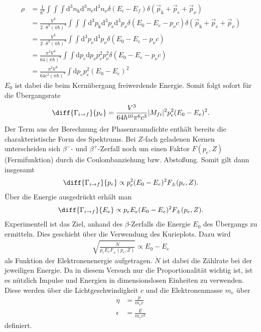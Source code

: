 \begin{align*}
  \rho&= \frac{1}{8^3}\int\int \int \mathrm{d}^3n_\mathrm{k} \mathrm{d}^3n_\mathrm{e}  \mathrm{d}^3n_\nu \delta (E_i-E_f) \delta (\vec{p}_\mathrm{k}+\vec{p}_e+\vec{p}_\nu)\\
  &=\frac{V^3}{2\cdot 8^3(\pi \hbar)^9} \int \int \int \mathrm{d}^3p_\mathrm{k}   \mathrm{d}^3p_\mathrm{e}  \mathrm{d}^3p_\nu\delta (E_0-E_e-p_\nu c) \delta (\vec{p}_\mathrm{k}+\vec{p}_e+\vec{p}_\nu)\\
  &=\frac{V^3}{2\cdot 8^3(\pi \hbar)^9}  \int \int  \mathrm{d}^3p_\mathrm{e} \mathrm{d}^3p_\nu \delta (E_0-E_e-p_\nu c)\\
  &= \frac{ \pi^2 V^3}{64(\pi \hbar)^9} \int \int \mathrm{d}p_e \mathrm{d}p_\nu p_e^2 p_\nu^2\delta (E_0-E_e-p_\nu c)\\
  &=\frac{ \pi^2 V^3}{64c^3 (\pi \hbar)^9} \int \mathrm{d}p_e p_e^2 (E_0-E_e)^2
\end{align*}
$E_0$ ist dabei die beim Kernübergang freiwerdende Energie. Somit folgt sofort für die Übergangsrate
\begin{align*}
  \diff{\Gamma_{i \rightarrow f}}{p_e}=\frac{ V^3}{64\hbar^{10} \pi^6 c^3}|M_{fi}|^2  p_e^2 (E_0-E_e)^2.
\end{align*}
Der Term aus der Berechnung der Phasenraumdichte enthält bereits die charakteristische Form des Spektrums. Bei $Z$-fach geladenen Kernen unterscheiden sich $\beta^-$- und $\beta^+$-Zerfall noch um einen Faktor $F(p_e,Z)$ (Fermifunktion) durch die Coulombanziehung bzw. Abstoßung. Somit gilt dann insgesamt 
\begin{align*}
  \diff{\Gamma_{i \rightarrow f}}{p_e} \propto p_e^2(E_0-E_e)^2 F_\pm(p_e,Z).
\end{align*}
Über die Energie ausgedrückt erhält man
\begin{align*}
  \diff{\Gamma_{i \rightarrow f}}{E_e} \propto p_eE_e(E_0-E_e)^2 F_\pm(p_e,Z).
\end{align*}
Experimentell ist das Ziel, anhand des $\beta$-Zerfalls die Energie $E_0$ des Übergangs zu ermitteln. Dies geschieht über die Verwendung des Kurieplots. Dazu wird 
\begin{align}
  \sqrt{\frac{\dot{N}}{p_eE_eF_\pm(p_e,Z)}} \propto E_0-E_e
  \label{equ:kurie}
\end{align}
als Funktion der Elektronenenergie aufgetragen. $\dot{N}$ ist dabei die Zählrate bei der jeweiligen Energie. Da in diesem Versuch nur die Proportionalität wichtig ist, ist es nützlich Impulse und Energien in dimensionslosen Einheiten zu verwenden. Diese werden über die Lichtgeschwindigkeit $c$ und die Elektronenmasse $m_e$ über
\begin{align*}
  \eta&=\frac{p}{m_ec}\\
  \epsilon&=\frac{E}{m_ec^2}
\end{align*}
definiert.\\

